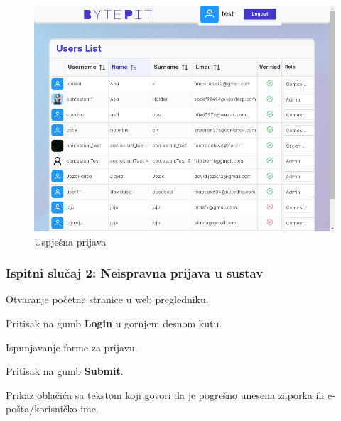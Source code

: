 			\begin{figure}[H]
				\includegraphics[scale=0.38]{slike/screenshot_test_result.PNG}
				\centering
				\caption{Uspješna prijava}
				\label{fig:sucess_login}
			\end{figure}
			
			\subsubsection{Ispitni slučaj 2: Neispravna prijava u sustav}
			
			
			\begin{packed_enum}
				
				\item  Otvaranje početne stranice u web pregledniku.
				\item  Pritisak na gumb \textbf{Login} u gornjem desnom kutu.
				\item  Ispunjavanje forme za prijavu.
				\item  Pritisak na gumb \textbf{Submit}. 
				
			\end{packed_enum}
			
			\begin{packed_enum}
				
				\item  Prikaz oblačića sa tekstom koji govori da je pogrešno unesena zaporka ili e-pošta/korisničko ime. 
				
			\end{packed_enum}
			
